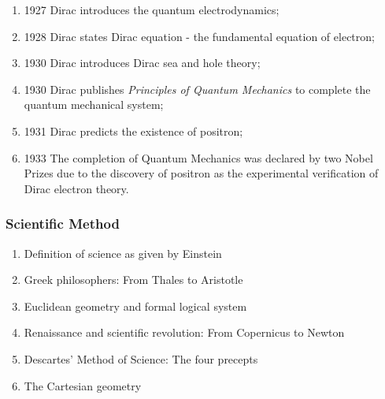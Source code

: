 \documentclass[12pt]{article}
\numberwithin{equation}{section}
\begin{document}
\begin{enumerate}
\begin{enumerate}
	\item 1927 Dirac introduces the quantum electrodynamics;
	\item 1928 Dirac states Dirac equation - the fundamental equation of electron;
	\item 1930 Dirac introduces Dirac sea and hole theory;
	\item 1930 Dirac publishes \textit{Principles of Quantum Mechanics} to complete the quantum mechanical system;
	\item 1931 Dirac predicts the existence of positron;
	\item 1933 The completion of Quantum Mechanics was declared by two Nobel Prizes due to the discovery of positron as the experimental verification of Dirac electron theory.
	\end{enumerate}
\end{enumerate}
\subsubsection{Scientific Method}
\begin{enumerate}
\item Definition of science as given by Einstein
\item Greek philosophers: From Thales to Aristotle
\item Euclidean geometry and formal logical system
\item Renaissance and scientific revolution: From Copernicus to Newton
\item Descartes' Method of Science: The four precepts
\item The Cartesian geometry
\end{enumerate}
\end{document}
